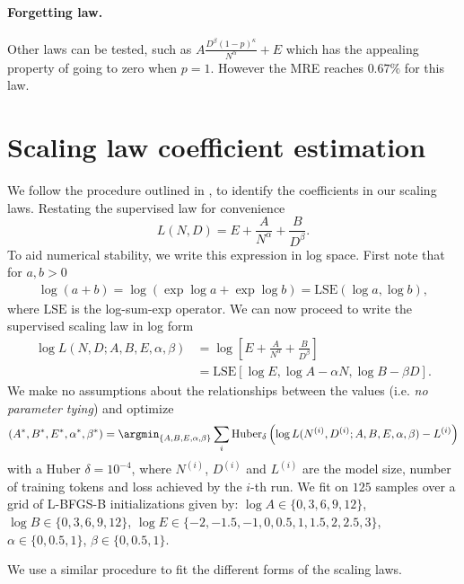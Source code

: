 \paragraph{Forgetting law.} Other laws can be tested, such as $A\frac{D^{\beta}(1-p)^{\kappa}}{N^{\alpha}}+E$ which has the appealing property of going to zero when $p=1$. However the MRE reaches $0.67\%$ for this law. 

\section{Scaling law coefficient estimation}
\label{ssec:supervised-scaling-law-coefficient-estimation}
We follow the procedure outlined in \citep{DBLP:journals/corr/abs-2203-15556,muennighoff2023scaling,besiroglu2024chinchilla}, to identify the coefficients in our scaling laws.
Restating the supervised law for convenience
\begin{equation}
	L(N,D)=
	E
	+
	\frac{A}{N^\alpha}+\frac{B}{D^\beta}.
\end{equation}
To aid numerical stability, we write this expression in log space.
First note that for $a,b>0$
\begin{align}
	\log(a+b)=\log\left(\exp\log a+ \exp\log b\right)=\mathrm{LSE}(\log a, \log b),
\end{align}
where $\mathrm{LSE}$ is the log-sum-exp operator.
We can now proceed to write the supervised scaling law in log form
\begin{align}
	\log L(N,D;A,B,E,\alpha,\beta)
	 & =
	\log \left[E
		+
	\frac{A}{N^\alpha}+\frac{B}{D^\beta}\right]                                             \\
	 & =\mathrm{LSE}\left[\log E, \log A - \alpha N, \log B - \beta D\right].
\end{align}
We make no assumptions about the relationships between the values (i.e. \emph{no parameter tying})
and optimize
\begin{align}
	(A^*,B^*,E^*,\alpha^*,\beta^*) = \argmin_{\{A,B,E,\alpha,\beta\}}\sum_i\mathrm{Huber}_\delta\left(\log L(N^{(i)},D^{(i)};A,B,E,\alpha,\beta)-L^{(i)}\right)
\end{align}
with a Huber $\delta=10^{-4}$,
where $N^{(i)}$, $D^{(i)}$ and $L^{(i)}$ are the model size, number of training tokens and loss achieved by the $i$-th run.
We fit on $125$ samples over a grid of L-BFGS-B initializations given by:
$\log A\in\{0, 3, 6, 9, 12\}$,
$\log B\in\{0, 3, 6, 9, 12\}$,
$\log E \in\{-2, -1.5, -1, 0, 0.5, 1, 1.5, 2, 2.5, 3\}$,
$\alpha\in\{0, 0.5, 1\}$,
$\beta\in\{0, 0.5, 1\}$.

We use a similar procedure to fit the different forms of the scaling laws.


